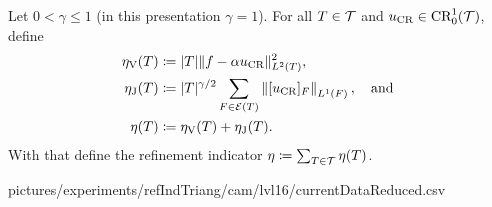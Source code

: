\begin{frame}
  \begin{definition}
    Let $0<\gamma\leq 1$ (in this presentation $\gamma=1$).
    For all $T\in\mathcal{T}$ and $u_\textup{CR}\in\textup{CR}^1_0(\mathcal{T})$, define
    \begin{align*}
      \eta_\text{V}(T)
      &\coloneqq
      |T|\Vert f-\alpha u_\textup{CR}\Vert^2_{L^2(T)},\\
      \eta_\text{J}(T)
      &\coloneqq |T|^{\gamma/2}\sum_{F\in\mathcal{E}(T)}\left\Vert
      [u_\textup{CR}]_F\right\Vert_{L^1(F)},\quad\text{and }\\
      \eta (T)
      &\coloneqq
      \eta_\text{V}(T) + \eta_\text{J}(T).
    \end{align*} 
    With that define the refinement indicator
    $\eta\coloneqq\sum_{T\in\mathcal{T}}\eta(T)$.
  \end{definition}
\end{frame}

{pictures/experiments/refIndTriang/cam/lvl16/currentDataReduced.csv}

